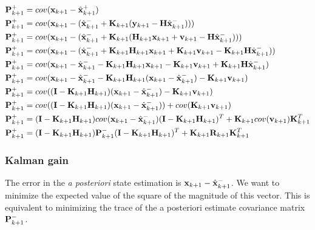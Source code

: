 \begin{align*}
  \mathbf{P}_{k+1}^+ &= cov(\mathbf{x}_{k+1} - \hat{\mathbf{x}}_{k+1}^+) \\
  \mathbf{P}_{k+1}^+ &= cov(\mathbf{x}_{k+1} - (\hat{\mathbf{x}}_{k+1}^- +
    \mathbf{K}_{k+1}(\mathbf{y}_{k+1} - \mathbf{H} \hat{\mathbf{x}}_{k+1}^-))) \\
  \mathbf{P}_{k+1}^+ &= cov(\mathbf{x}_{k+1} - (\hat{\mathbf{x}}_{k+1}^- +
    \mathbf{K}_{k+1}(\mathbf{H}_{k+1}\mathbf{x}_{k+1} + \mathbf{v}_{k+1} -
    \mathbf{H} \hat{\mathbf{x}}_{k+1}^-))) \\
  \mathbf{P}_{k+1}^+ &= cov(\mathbf{x}_{k+1} - (\hat{\mathbf{x}}_{k+1}^- +
    \mathbf{K}_{k+1}\mathbf{H}_{k+1}\mathbf{x}_{k+1} + \mathbf{K}_{k+1}\mathbf{v}_{k+1} -
    \mathbf{K}_{k+1}\mathbf{H} \hat{\mathbf{x}}_{k+1}^-)) \\
  \mathbf{P}_{k+1}^+ &= cov(\mathbf{x}_{k+1} - \hat{\mathbf{x}}_{k+1}^- -
    \mathbf{K}_{k+1}\mathbf{H}_{k+1}\mathbf{x}_{k+1} - \mathbf{K}_{k+1}\mathbf{v}_{k+1} +
    \mathbf{K}_{k+1}\mathbf{H} \hat{\mathbf{x}}_{k+1}^-) \\
  \mathbf{P}_{k+1}^+ &= cov(\mathbf{x}_{k+1} - \hat{\mathbf{x}}_{k+1}^- -
    \mathbf{K}_{k+1}\mathbf{H}_{k+1}(\mathbf{x}_{k+1} - \hat{\mathbf{x}}_{k+1}^-) -
    \mathbf{K}_{k+1}\mathbf{v}_{k+1}) \\
  \mathbf{P}_{k+1}^+ &= cov((\mathbf{I} - \mathbf{K}_{k+1}\mathbf{H}_{k+1})
    (\mathbf{x}_{k+1} - \hat{\mathbf{x}}_{k+1}^-) - \mathbf{K}_{k+1}\mathbf{v}_{k+1}) \\
  \mathbf{P}_{k+1}^+ &= cov((\mathbf{I} - \mathbf{K}_{k+1}\mathbf{H}_{k+1})
    (\mathbf{x}_{k+1} - \hat{\mathbf{x}}_{k+1}^-)) + cov(\mathbf{K}_{k+1}\mathbf{v}_{k+1})
    \\
  \mathbf{P}_{k+1}^+ &= (\mathbf{I} - \mathbf{K}_{k+1}\mathbf{H}_{k+1})
    cov(\mathbf{x}_{k+1} - \hat{\mathbf{x}}_{k+1}^-)
    (\mathbf{I} - \mathbf{K}_{k+1}\mathbf{H}_{k+1})^T + \mathbf{K}_{k+1}cov(\mathbf{v}_{k+1})
    \mathbf{K}_{k+1}^T \\
  \mathbf{P}_{k+1}^+ &= (\mathbf{I} - \mathbf{K}_{k+1}\mathbf{H}_{k+1})\mathbf{P}_{k+1}^-
    (\mathbf{I} - \mathbf{K}_{k+1}\mathbf{H}_{k+1})^T + \mathbf{K}_{k+1}\mathbf{R}_{k+1}
    \mathbf{K}_{k+1}^T \\
\end{align*}

\subsubsection{Kalman gain}

The error in the \textit{a posteriori} \gls{state} estimation is
$\mathbf{x}_{k+1} - \hat{\mathbf{x}}_{k+1}^-$. We want to minimize the expected value
of the square of the magnitude of this vector. This is equivalent to minimizing
the trace of the a posteriori estimate covariance matrix $\mathbf{P}_{k+1}^-$.


